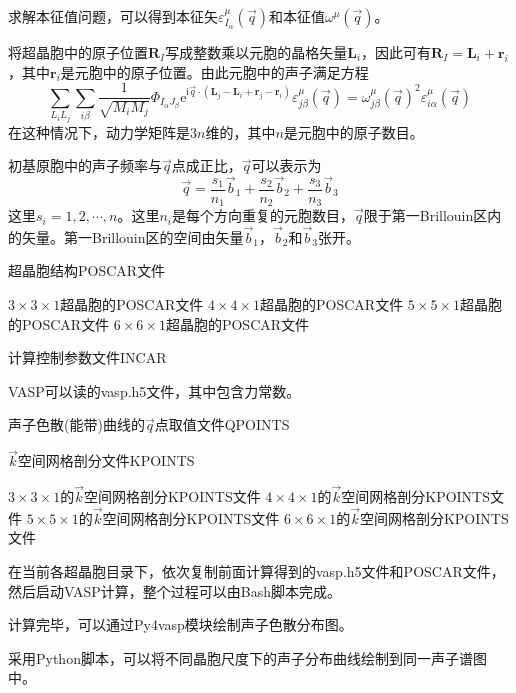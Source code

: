 求解本征值问题，可以得到本征矢$\varepsilon_{I_{\alpha}}^{\mu}(\vec q)$和本征值$\omega^{\mu}(\vec q)$。

将超晶胞中的原子位置$\mathbf{R}_I$写成整数乘以元胞的晶格矢量$\mathbf{L}_i$，因此可有$\mathbf{R}_I=\mathbf{L}_i+\mathbf{r}_i$，其中$\mathbf{r}_i$是元胞中的原子位置。由此元胞中的声子满足方程
\begin{displaymath}
	\sum_{L_iL_j}\sum_{i\beta}\dfrac1{\sqrt{M_iM_j}}\Phi_{I_{\alpha}J_{\beta}}\mathrm{e}^{\mathrm{i}\vec q\cdot(\mathbf{L}_j-\mathbf{L}_i+\mathbf{r}_j-\mathbf{r}_i)}\varepsilon_{j\beta}^{\mu}(\vec q)=\omega_{j\beta}^{\mu}(\vec q)^2\varepsilon_{i\alpha}^{\mu}(\vec q)
\end{displaymath}
在这种情况下，动力学矩阵是$3n$维的，其中$n$是元胞中的原子数目。

初基原胞中的声子频率与$\vec q$点成正比，$\vec q$可以表示为
\begin{displaymath}
	\vec q=\dfrac{s_1}{n_1}\vec b_1+\dfrac{s_2}{n_2}\vec b_2+\dfrac{s_3}{n_3}\vec b_3
\end{displaymath}
这里$s_i=1,2,\cdots,n$。这里$n_i$是每个方向重复的元胞数目，$\vec q$限于第一\textrm{Brillouin}区内的矢量。第一\textrm{Brillouin}区的空间由矢量$\vec b_1$，$\vec b_2$和$\vec b_3$张开。

超晶胞结构\textrm{POSCAR}文件

$3\times3\times1$超晶胞的\textrm{POSCAR}文件
$4\times4\times1$超晶胞的\textrm{POSCAR}文件
$5\times5\times1$超晶胞的\textrm{POSCAR}文件
$6\times6\times1$超晶胞的\textrm{POSCAR}文件

计算控制参数文件\textrm{INCAR}

\textrm{VASP}可以读的\textrm{vasp.h5}文件，其中包含力常数。

声子色散(能带)曲线的$\vec q$点取值文件\textrm{QPOINTS}

$\vec k$空间网格剖分文件\textrm{KPOINTS}

$3\times3\times1$的$\vec k$空间网格剖分\textrm{KPOINTS}文件
$4\times4\times1$的$\vec k$空间网格剖分\textrm{KPOINTS}文件
$5\times5\times1$的$\vec k$空间网格剖分\textrm{KPOINTS}文件
$6\times6\times1$的$\vec k$空间网格剖分\textrm{KPOINTS}文件

在当前各超晶胞目录下，依次复制前面计算得到的\textrm{vasp.h5}文件和\textrm{POSCAR}文件，然后启动\textrm{VASP}计算，整个过程可以由\textrm{Bash}脚本完成。

计算完毕，可以通过\textrm{Py4vasp}模块绘制声子色散分布图。

采用\textrm{Python}脚本，可以将不同晶胞尺度下的声子分布曲线绘制到同一声子谱图中。

